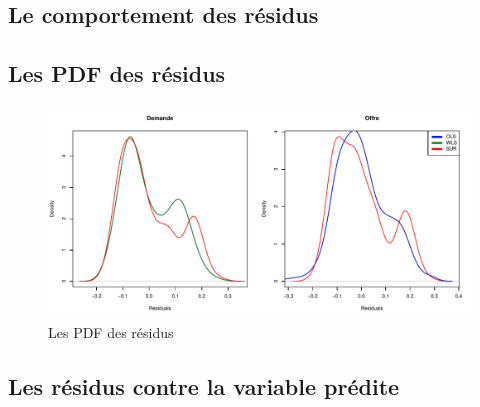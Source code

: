 \documentclass[11pt,]{article}
\begin{document}
\hypertarget{le-comportement-des-residus}{%
\subsection{Le comportement des
résidus}\label{le-comportement-des-residus}}

\FloatBarrier

\FloatBarrier

\FloatBarrier

\hypertarget{les-pdf-des-residus}{%
\subsection{Les PDF des résidus}\label{les-pdf-des-residus}}

\FloatBarrier

\begin{figure}[!htbp]

{\centering \includegraphics{note2pres_files/figure-latex/unnamed-chunk-47-1} 

}

\caption{Les PDF des résidus}\label{fig:unnamed-chunk-47}
\end{figure}

\FloatBarrier

\hypertarget{les-residus-contre-la-variable-predite}{%
\subsection{Les résidus contre la variable
prédite}\label{les-residus-contre-la-variable-predite}}

\FloatBarrier
\end{document}
